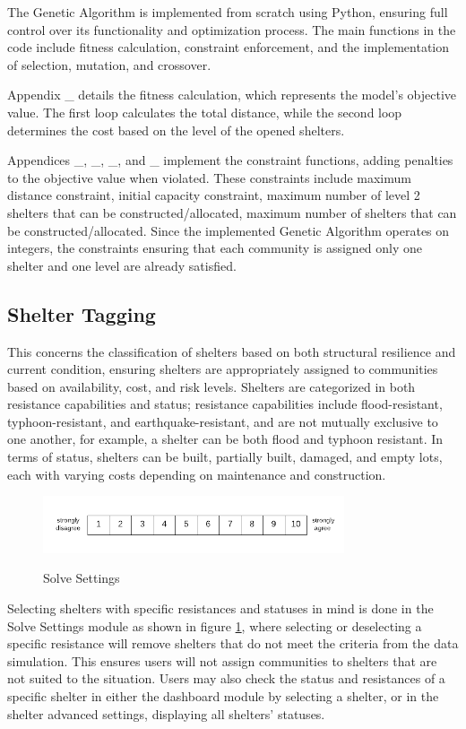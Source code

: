 	The Genetic Algorithm is implemented from scratch using Python, ensuring full control over its functionality and optimization process. The main functions in the code include fitness calculation, constraint enforcement, and the implementation of selection, mutation, and crossover.
	
	Appendix \_ details the fitness calculation, which represents the model's objective value. The first loop calculates the total distance, while the second loop determines the cost based on the level of the opened shelters.
	
	Appendices \_, \_, \_, and \_ implement the constraint functions, adding penalties to the objective value when violated. These constraints include maximum distance constraint, initial capacity constraint, maximum number of level 2 shelters that can be constructed/allocated, maximum number of shelters that can be constructed/allocated. Since the implemented Genetic Algorithm operates on integers, the constraints ensuring that each community is assigned only one shelter and one level are already satisfied.
	
\subsection{Shelter Tagging}
	This concerns the classification of shelters based on both structural resilience and current condition, ensuring shelters are appropriately assigned to communities based on availability, cost, and risk levels. Shelters are categorized in both resistance capabilities and status; resistance capabilities include flood-resistant, typhoon-resistant, and earthquake-resistant, and are not mutually exclusive to one another, for example, a shelter can be both flood and typhoon resistant. In terms of status, shelters can be built, partially built, damaged, and empty lots, each with varying costs depending on maintenance and construction.
	
	\begin{figure}[h!]
		\caption{Solve Settings}
		\centering
		\includegraphics[width=3.5in]{Nrs-10}
		\label{solveSet}
	\end{figure}
	Selecting shelters with specific resistances and statuses in mind is done in the Solve Settings module as shown in figure \ref{solveSet}, where selecting or deselecting a specific resistance will remove shelters that do not meet the criteria from the data simulation. This ensures users will not assign communities to shelters that are not suited to the situation. Users may also check the status and resistances of a specific shelter in either the dashboard module by selecting a shelter, or in the shelter advanced settings, displaying all shelters’ statuses.
	

